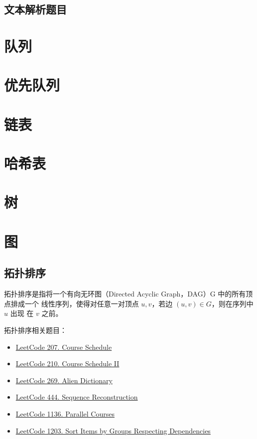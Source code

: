 \subsection{文本解析题目}

\section{队列}

\section{优先队列}

\section{链表}

\section{哈希表}

\section{树}

\section{图}

\subsection{拓扑排序}
拓扑排序是指将一个有向无环图（Directed Acyclic Graph，DAG）G 中的所有顶点排成一个
线性序列，使得对任意一对顶点 $u, v$，若边 $(u, v) \in G$，则在序列中 $u$ 出现
在 $v$ 之前。

拓扑排序相关题目：
\begin{itemize}
  \item
    \href{https://leetcode.com/problems/course-schedule/}{LeetCode 207. Course Schedule}
  \item
    \href{https://leetcode.com/problems/course-schedule-ii/}{LeetCode 210. Course Schedule II}
  \item
    \href{https://leetcode.com/problems/alien-dictionary}{LeetCode 269. Alien Dictionary}
  \item
    \href{https://leetcode.com/problems/sequence-reconstruction}{LeetCode 444.
      Sequence Reconstruction}
  \item
    \href{https://leetcode.com/problems/parallel-courses}{LeetCode 1136. Parallel Courses}
  \item
    \href{https://leetcode.com/problems/sort-items-by-groups-respecting-dependencies/}{LeetCode
      1203. Sort Items by Groups Respecting Dependencies}
\end{itemize}

